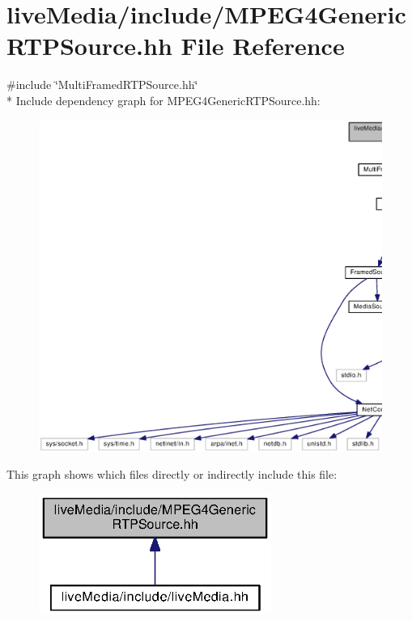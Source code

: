 \section{live\+Media/include/\+M\+P\+E\+G4\+Generic\+R\+T\+P\+Source.hh File Reference}
\label{MPEG4GenericRTPSource_8hh}
{\ttfamily \#include \char`\"{}Multi\+Framed\+R\+T\+P\+Source.\+hh\char`\"{}}\\*
Include dependency graph for M\+P\+E\+G4\+Generic\+R\+T\+P\+Source.\+hh\+:
\nopagebreak
\begin{figure}[H]
\begin{center}
\leavevmode
\includegraphics[width=350pt]{MPEG4GenericRTPSource_8hh__incl}
\end{center}
\end{figure}
This graph shows which files directly or indirectly include this file\+:
\nopagebreak
\begin{figure}[H]
\begin{center}
\leavevmode
\includegraphics[width=215pt]{MPEG4GenericRTPSource_8hh__dep__incl}
\end{center}
\end{figure}
